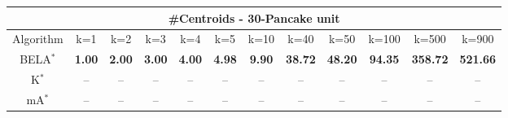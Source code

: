 \begin{tabular}{c|ccccccccccc}\toprule
\multicolumn{12}{c}{#Centroids - 30-Pancake unit}\\ \midrule
Algorithm & k=1 & k=2 & k=3 & k=4 & k=5 & k=10 & k=40 & k=50 & k=100 & k=500 & k=900 \\ \midrule
BELA$^*$ & \textbf{1.00} & \textbf{2.00} & \textbf{3.00} & \textbf{4.00} & \textbf{4.98} & \textbf{9.90} & \textbf{38.72} & \textbf{48.20} & \textbf{94.35} & \textbf{358.72} & \textbf{521.66} \\
K$^*$ & -- & -- & -- & -- & -- & -- & -- & -- & -- & -- & -- \\
mA$^*$ & -- & -- & -- & -- & -- & -- & -- & -- & -- & -- & -- \\ \bottomrule 
\end{tabular}
